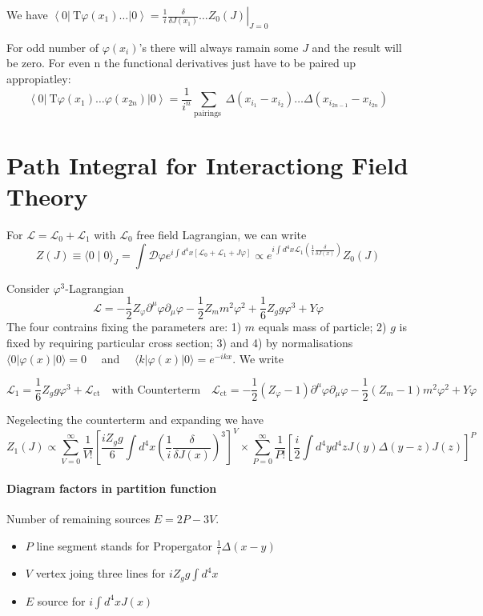 We have $\left\langle 0\left|\mathrm{~T} \varphi\left(x_1\right) \ldots\right| 0\right\rangle=\left.\frac{1}{i} \frac{\delta}{\delta J\left(x_1\right)} \ldots Z_0(J)\right|_{J=0}$

\begin{theorem}
  For odd number of $\varphi(x_i)$'s there will always ramain some $J$ and the result will be zero. For even n
  the functional derivatives just have to be paired up appropiatley:
  $$\left\langle 0\left|\mathrm{~T} \varphi\left(x_1\right) \ldots \varphi\left(x_{2 n}\right)\right| 0\right\rangle=\frac{1}{i^n} \sum_{\text {pairings }} \Delta\left(x_{i_1}-x_{i_2}\right) \ldots \Delta\left(x_{i_{2 n-1}}-x_{i_{2 n}}\right)$$
\end{theorem}

\section{Path Integral for Interactiong Field Theory}

For $\mathcal{L}= \mathcal{L}_0+ \mathcal{L}_1$ with $\mathcal{L}_0$ free field Lagrangian, we can write 
$$Z(J) \equiv\langle 0 \mid 0\rangle_J=\int \mathcal{D} \varphi e^{i \int d^4 x\left[\mathcal{L}_0+\mathcal{L}_1+J \varphi\right]} \propto e^{i \int d^4 x \mathcal{L}_1\left(\frac{1}{i} \frac{\delta}{\delta J(x)}\right)} Z_0(J)$$

Consider $\varphi^3$-Lagrangian
$$\mathcal{L}=-\frac{1}{2} Z_{\varphi} \partial^\mu \varphi \partial_\mu \varphi-\frac{1}{2} Z_m m^2 \varphi^2+\frac{1}{6} Z_g g \varphi^3+Y \varphi$$
The four contrains fixing the parameters are: 1) $m$ equals mass of particle; 2) $g$ is fixed by requiring particular cross section;
3) and 4) by normalisations $\langle 0|\varphi(x)| 0\rangle=0 \quad$ and $\quad\langle k|\varphi(x)| 0\rangle=e^{-i k x}$. We write 

$$ \mathcal{L}_1 =\frac{1}{6} Z_g g \varphi^3+\mathcal{L}_{\mathrm{ct}} \quad \text{with Counterterm} \quad \mathcal{L}_{\mathrm{ct}} =-\frac{1}{2}\left(Z_{\varphi}-1\right) \partial^\mu \varphi \partial_\mu \varphi-\frac{1}{2}\left(Z_m-1\right) m^2 \varphi^2+Y \varphi$$

Negelecting the counterterm and expanding we have $$ Z_1(J) \propto  \sum_{V=0}^{\infty} \frac{1}{V !}\left[\frac{i Z_g g}{6} \int d^4 x\left(\frac{1}{i} \frac{\delta}{\delta J(x)}\right)^3\right]^V \times \sum_{P=0}^{\infty} \frac{1}{P !}\left[\frac{i}{2} \int d^4 y d^4 z J(y) \Delta(y-z) J(z)\right]^P $$

\paragraph{Diagram factors in partition function} Number of remaining sources $E=2P-3V$.
\begin{itemize}
  \item $P$ line segment stands for Propergator $\frac{1}{i} \Delta(x-y)$
  \item $V$ vertex joing three lines for $i Z_g g \int d^4 x$
  \item $E$ source for $i \int d^4 x J(x)$
\end{itemize}


